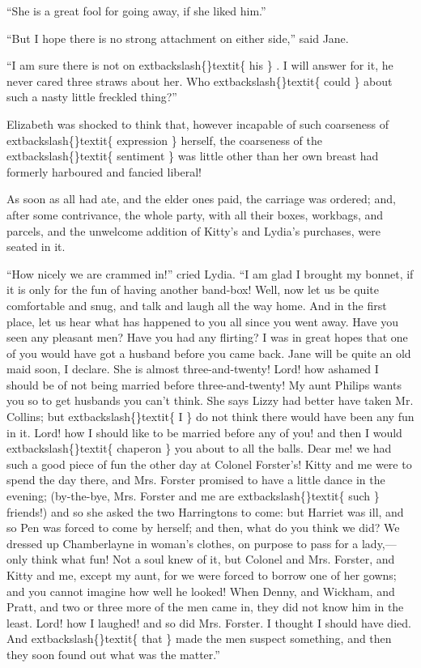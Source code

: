 \documentclass[10pt]{book}
\begin{document}
   “She is a great fool for going away, if she liked him.”
  

   “But I hope there is no strong attachment on either side,” said Jane.
  

   “I am sure there is not on
   	extbackslash\{\}textit\{
    his
   \}
   . I will answer for it, he never cared
three straws about her. Who
   	extbackslash\{\}textit\{
    could
   \}
   about such a nasty little freckled
thing?”
  

   Elizabeth was shocked to think that, however incapable of such
coarseness of
   	extbackslash\{\}textit\{
    expression
   \}
   herself, the coarseness of the
   	extbackslash\{\}textit\{
    sentiment
   \}
   was little other than her own breast had formerly harboured and fancied
liberal!
  

   As soon as all had ate, and the elder ones paid, the carriage was
ordered; and, after some contrivance, the whole party, with all their
boxes, workbags, and parcels, and the unwelcome addition of Kitty’s and
Lydia’s purchases, were seated in it.
  

   “How nicely we are crammed in!” cried Lydia. “I am glad I brought my
bonnet, if it is only for the fun of having another band-box! Well, now
let us be quite comfortable and snug, and talk and laugh all the way
home. And in the first place, let us hear what has happened to you all
since you went away. Have you seen any pleasant men? Have you had any
flirting? I was in great hopes that one of you would have got a husband
before you came back. Jane will be quite an old maid soon, I declare.
She is almost three-and-twenty! Lord! how ashamed I should be of not
being married before three-and-twenty! My aunt Philips wants you so to
get husbands you can’t think. She says Lizzy had better have taken Mr.
Collins; but
   	extbackslash\{\}textit\{
    I
   \}
   do not think there would have been any fun in it. Lord!
how I should like to be married before any of you! and then I would
   	extbackslash\{\}textit\{
    chaperon
   \}
   you about to all the balls. Dear me! we had such a good piece
of fun the other day at Colonel Forster’s! Kitty and me were to spend
the day there, and Mrs. Forster promised to have a little dance in the
evening; (by-the-bye, Mrs. Forster and me are
   	extbackslash\{\}textit\{
    such
   \}
   friends!) and so
she asked the two Harringtons to come: but Harriet was ill, and so Pen
was forced to come by herself; and then, what do you think we did? We
dressed up Chamberlayne in woman’s clothes, on purpose to pass for a
lady,—only think what fun! Not a soul knew of it, but Colonel and Mrs.
Forster, and Kitty and me, except my aunt, for we were forced to borrow
one of her gowns; and you cannot imagine how well he looked! When Denny,
and Wickham, and Pratt, and two or three more of the men came in, they
did not know him in the least. Lord! how I laughed! and so did Mrs.
Forster. I thought I should have died. And
   	extbackslash\{\}textit\{
    that
   \}
   made the men
   suspect
something, and then they soon found out what was the matter.”
  
\end{document}
